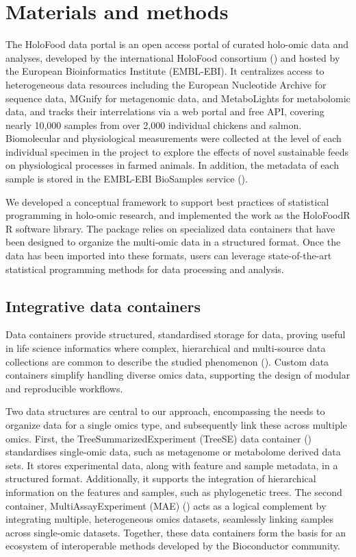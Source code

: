\documentclass[unnumsec,webpdf,namedate,modern,large]{oup-authoring-template}%
\begin{document}
\section{Materials and methods}

The HoloFood data portal is an open access portal of curated holo-omic data and analyses, developed by the international HoloFood consortium (\cite{rogers_holofood_2025}) and hosted by the European Bioinformatics Institute (EMBL-EBI). It centralizes access to heterogeneous data resources including the European Nucleotide Archive for sequence data, MGnify for metagenomic data, and MetaboLights for metabolomic data, and tracks their interrelations via a web portal and free API, covering nearly 10,000 samples from over 2,000 individual chickens and salmon. Biomolecular and physiological measurements were collected at the level of each individual specimen in the project to explore the effects of novel sustainable feeds on physiological processes in farmed animals. In addition, the metadata of each sample is stored in the EMBL-EBI BioSamples service (\cite{courtot_2018}).

We developed a conceptual framework to support best practices of statistical programming in holo-omic research, and implemented the work as the HoloFoodR R software library. The package relies on specialized data containers that have been designed to organize the multi-omic data in a structured format. Once the data has been imported into these formats, users can leverage state-of-the-art statistical programming methods for data processing and analysis.

\vspace{-1em}
\subsection{Integrative data containers}

Data containers provide structured, standardised storage for data, proving useful in life science informatics where complex, hierarchical and multi-source data collections are common to describe the studied phenomenon (\cite{drnevich_2025}). Custom data containers simplify handling diverse omics data, supporting the design of modular and reproducible workflows.

Two data structures are central to our approach, encompassing the needs to organize data for a single omics type, and subsequently link these across multiple omics.
First, the TreeSummarizedExperiment (TreeSE) data container (\cite{huang_treesummarizedexperiment_2021}) standardises single-omic data, such as metagenome or metabolome derived data sets. It stores experimental data, along with feature and sample metadata, in a structured format. Additionally, it supports the integration of hierarchical information on the features and samples, such as phylogenetic trees. The second container, MultiAssayExperiment (MAE) (\cite{ramos_software_2017}) acts as a logical complement by integrating multiple, heterogeneous omics datasets, seamlessly linking samples across single-omic datasets. Together, these data containers form the basis for an ecosystem of interoperable methods developed by the Bioconductor community.
\end{document}

